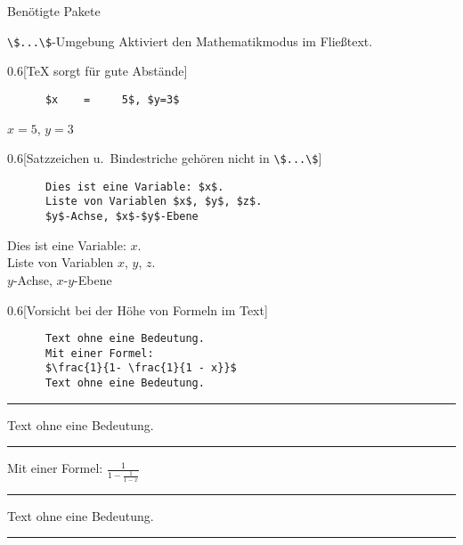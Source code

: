 \begin{frame}[fragile,t]{
  Benötigte Pakete
  \hfill
}

  \vspace{5pt}
\end{frame}

\begin{frame}[fragile]{\lstinline+\$...\$+-Umgebung}
  Aktiviert den Mathematikmodus im Fließtext.

  \begin{CodeExample}{0.6}[\TeX{} sorgt für gute Abstände]
    \begin{lstlisting}
      $x    =     5$, $y=3$
    \end{lstlisting}
  \CodeResult
    \strut
    $x    =     5$, $y=3$
  \end{CodeExample}

  \begin{CodeExample}{0.6}[Satzzeichen u.\ Bindestriche gehören nicht in \lstinline+\$...\$+]
    \begin{lstlisting}
      Dies ist eine Variable: $x$.
      Liste von Variablen $x$, $y$, $z$.
      $y$-Achse, $x$-$y$-Ebene
    \end{lstlisting}
  \CodeResult
    \strut
    Dies ist eine Variable: $x$. \\
    Liste von Variablen $x$, $y$, $z$. \\
    $y$-Achse, $x$-$y$-Ebene
  \end{CodeExample}
  \begin{CodeExample}{0.6}[Vorsicht bei der Höhe von Formeln im Text]
    \begin{lstlisting}
      Text ohne eine Bedeutung.
      Mit einer Formel:
      $\frac{1}{1- \frac{1}{1 - x}}$
      Text ohne eine Bedeutung.
    \end{lstlisting}
  \CodeResult
    \hrule
    Text ohne eine Bedeutung.
    \hrule
    Mit einer Formel: $\frac{1}{1- \frac{1}{1 - x}}$
    \hrule
    Text ohne eine Bedeutung.
    \hrule
  \end{CodeExample}
\end{frame}

